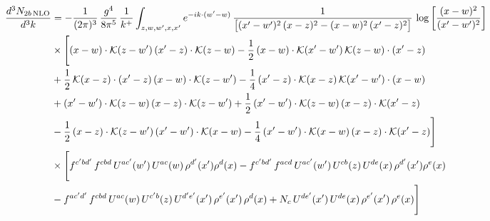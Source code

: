 \documentclass[9pt]{article}
\numberwithin{equation}{section}
\begin{document}
\begin{align}
\frac{d^{3}N_{2b\,\rm NLO}}{d^{3}k}&= -\frac{1}{(2\pi)^{3}}\,\frac{g^{4}}{8\pi^{5}}\,\frac{1}{k^{+}}\int_{z,w,w^{\prime},x,x^{\prime}}e^{-ik\cdot(w^{\prime}-w)}\,\frac{1}{\big[(x^{\prime}-w^{\prime})^{2}\,(x-z)^{2}-(x-w)^{2}\,(x^{\prime}-z)^{2}\big]}\,\log\left[\frac{(x-w)^{2}}{(x^{\prime}-w^{\prime})^{2}}\right]\notag\\
&\times\Bigg[(x-w)\cdot\mathcal{K}(z-w^{\prime})\,(x^{\prime}-z)\cdot\mathcal{K}(z-w)-\frac{1}{2}\,(x-w)\cdot\mathcal{K}(x^{\prime}-w^{\prime})\,\mathcal{K}(z-w)\cdot(x^{\prime}-z)\notag \\ & +\frac{1}{2}\,\mathcal{K}(x-z)\cdot(x^{\prime}-z)\,(x-w)\cdot\mathcal{K}(z-w^{\prime}) -\frac{1}{4}\,(x^{\prime}-z)\cdot\mathcal{K}(x-z)\,\mathcal{K}(x^{\prime}-w^{\prime})\cdot(x-w)\notag \\ & +(x^{\prime}-w^{\prime})\cdot\mathcal{K}(z-w)\,(x-z)\cdot\mathcal{K}(z-w^{\prime})+\frac{1}{2}\,(x^{\prime}-w^{\prime})\cdot\mathcal{K}(z-w)\,(x-z)\cdot\mathcal{K}(x^{\prime}-z)\notag \\ & -\frac{1}{2}\,(x-z)\cdot\mathcal{K}(z-w^{\prime})\,(x^{\prime}-w^{\prime})\cdot\mathcal{K}(x-w)-\frac{1}{4}\,(x^{\prime}-w^{\prime})\cdot\mathcal{K}(x-w)\,(x-z)\cdot\mathcal{K}(x^{\prime}-z)\Bigg]\notag\\
&\times\Bigg[f^{c^{\prime}bd^{\prime}}\,f^{cbd}\, U^{ac^{\prime}}(w^{\prime})\,U^{ac}(w)\,\rho^{d^{\prime}}(x^{\prime})\rho^{d}(x)- f^{c^{\prime}bd^{\prime}}\,f^{acd}\,U^{ac^{\prime}}(w^{\prime})\,U^{cb}(z)\,U^{de}(x)\,\rho^{d^{\prime}}(x^{\prime})\rho^{e}(x) \notag \\ & -f^{ac^{\prime}d^{\prime}}\,f^{cbd}\,U^{ac}(w)\,U^{c^{\prime}b}(z)\,U^{d^{\prime}e^{\prime}}(x^{\prime})\,\rho^{e^{\prime}}(x^{\prime})\,\rho^{d}(x) +N_{c}\,U^{de^{\prime}}(x^{\prime})\,U^{de}(x)\,\rho^{e^{\prime}}(x^{\prime})\,\rho^{e}(x)\Bigg]
\end{align}
\end{document}
